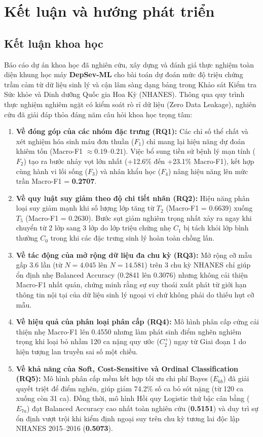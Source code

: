 \chapter{Kết luận và hướng phát triển}
\label{ch:ket-luan}

\section{Kết luận khoa học}
\label{sec:ket-luan-khoa-hoc}

Báo cáo dự án khoa học đã nghiên cứu, xây dựng và đánh giá thực nghiệm toàn diện khung học máy \textbf{DepSev-ML} cho bài toán dự đoán mức độ triệu chứng trầm cảm từ dữ liệu sinh lý và cận lâm sàng dạng bảng trong Khảo sát Kiểm tra Sức khỏe và Dinh dưỡng Quốc gia Hoa Kỳ (NHANES). Thông qua quy trình thực nghiệm nghiêm ngặt có kiểm soát rò rỉ dữ liệu (Zero Data Leakage), nghiên cứu đã giải đáp thỏa đáng năm câu hỏi khoa học trọng tâm:

\begin{enumerate}
    \item \textbf{Về đóng góp của các nhóm đặc trưng (RQ1):} Các chỉ số thể chất và xét nghiệm hóa sinh máu đơn thuần ($F_1$) chỉ mang lại hiệu năng dự đoán khiêm tốn (Macro-F1 $\approx 0.19$--$0.21$). Việc bổ sung tiền sử bệnh lý mạn tính ($F_2$) tạo ra bước nhảy vọt lớn nhất (+12.6\% đến +23.1\% Macro-F1), kết hợp cùng hành vi lối sống ($F_3$) và nhân khẩu học ($F_4$) nâng hiệu năng lên mức trần Macro-F1 = \textbf{0.2707}.
    \item \textbf{Về quy luật suy giảm theo độ chi tiết nhãn (RQ2):} Hiệu năng phân loại suy giảm mạnh khi số lượng lớp tăng từ $T_2$ (Macro-F1 = 0.6639) xuống $T_5$ (Macro-F1 = 0.2630). Bước sụt giảm nghiêm trọng nhất xảy ra ngay khi chuyển từ 2 lớp sang 3 lớp do lớp triệu chứng nhẹ $C_1$ bị tách khỏi lớp bình thường $C_0$ trong khi các đặc trưng sinh lý hoàn toàn chồng lấn.
    \item \textbf{Về tác động của mở rộng dữ liệu đa chu kỳ (RQ3):} Mở rộng cỡ mẫu gấp 3.6 lần (từ $N = 4.045$ lên $N = 14.581$) trên 3 chu kỳ NHANES chỉ giúp ổn định nhẹ Balanced Accuracy (0.2841 lên 0.3076) nhưng không cải thiện Macro-F1 nhất quán, chứng minh rằng sự suy thoái xuất phát từ giới hạn thông tin nội tại của dữ liệu sinh lý ngoại vi chứ không phải do thiếu hụt cỡ mẫu.
    \item \textbf{Về hiệu quả của phân loại phân cấp (RQ4):} Mô hình phân cấp cứng cải thiện nhẹ Macro-F1 lên 0.4550 nhưng làm phát sinh điểm nghẽn nghiêm trọng khi loại bỏ nhầm 120 ca nặng quy ước ($C_2^+$) ngay từ Giai đoạn 1 do hiện tượng lan truyền sai số một chiều.
    \item \textbf{Về khả năng của Soft, Cost-Sensitive và Ordinal Classification (RQ5):} Mô hình phân cấp mềm kết hợp tối ưu chi phí Bayes ($E_{6b}$) đã giải quyết triệt để điểm nghẽn, giúp giảm 74.2\% số ca bỏ sót nặng (từ 120 ca xuống còn 31 ca). Đồng thời, mô hình Hồi quy Logistic thứ bậc cân bằng ($E_{7a}$) đạt Balanced Accuracy cao nhất toàn nghiên cứu (\textbf{0.5151}) và duy trì sự ổn định vượt trội khi kiểm định ngoại suy trên chu kỳ tương lai độc lập NHANES 2015--2016 (\textbf{0.5073}).
\end{enumerate}

